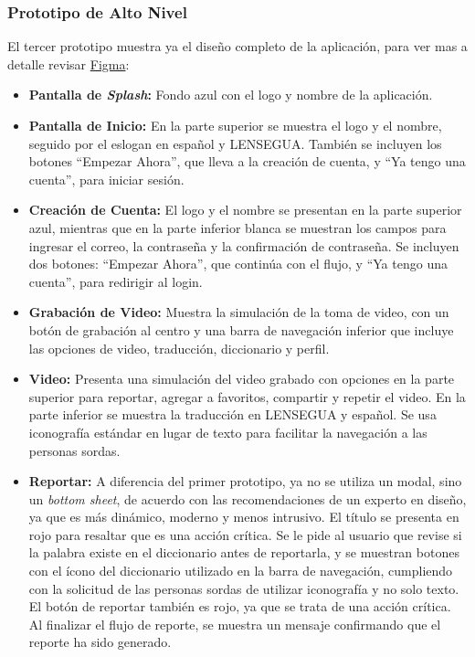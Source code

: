 \subsubsection{Prototipo de Alto Nivel}

El tercer prototipo muestra ya el diseño completo de la aplicación, para ver mas a detalle revisar \href{https://www.figma.com/design/d7NOw36r1mUY7qDBIveJ2K/Se%C3%B1as-Chapinas?node-id=322-1684&node-type=CANVAS&t=ua1wEji5yxVRI6ES-0}{Figma}:

\begin{itemize}
    \item \textbf{Pantalla de \textit{Splash}:} Fondo azul con el logo y nombre de la aplicación.
  
    \item \textbf{Pantalla de Inicio:} En la parte superior se muestra el logo y el nombre, seguido por el eslogan en español y LENSEGUA. También se incluyen los botones ``Empezar Ahora'', que lleva a la creación de cuenta, y ``Ya tengo una cuenta'', para iniciar sesión.
  
    \item \textbf{Creación de Cuenta:} El logo y el nombre se presentan en la parte superior azul, mientras que en la parte inferior blanca se muestran los campos para ingresar el correo, la contraseña y la confirmación de contraseña. Se incluyen dos botones: ``Empezar Ahora'', que continúa con el flujo, y ``Ya tengo una cuenta'', para redirigir al login.
  
    \item \textbf{Grabación de Video:} Muestra la simulación de la toma de video, con un botón de grabación al centro y una barra de navegación inferior que incluye las opciones de video, traducción, diccionario y perfil.

    \item \textbf{Video:} Presenta una simulación del video grabado con opciones en la parte superior para reportar, agregar a favoritos, compartir y repetir el video. En la parte inferior se muestra la traducción en LENSEGUA y español. Se usa iconografía estándar en lugar de texto para facilitar la navegación a las personas sordas.

    \item \textbf{Reportar:} A diferencia del primer prototipo, ya no se utiliza un modal, sino un \textit{bottom sheet}, de acuerdo con las recomendaciones de un experto en diseño, ya que es más dinámico, moderno y menos intrusivo. El título se presenta en rojo para resaltar que es una acción crítica. Se le pide al usuario que revise si la palabra existe en el diccionario antes de reportarla, y se muestran botones con el ícono del diccionario utilizado en la barra de navegación, cumpliendo con la solicitud de las personas sordas de utilizar iconografía y no solo texto. El botón de reportar también es rojo, ya que se trata de una acción crítica. Al finalizar el flujo de reporte, se muestra un mensaje confirmando que el reporte ha sido generado.


\end{itemize}
